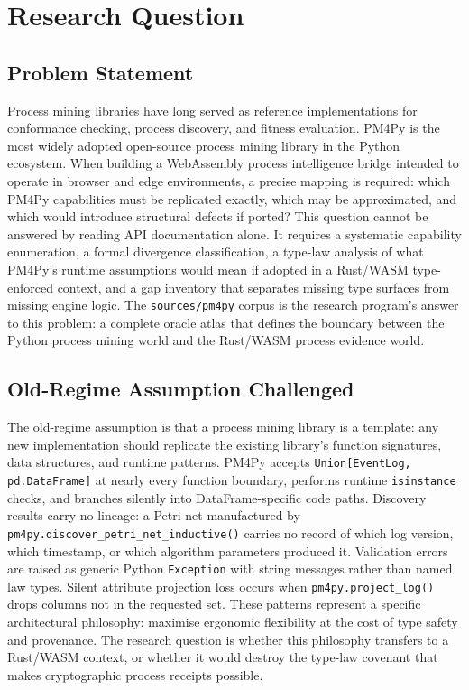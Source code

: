 
\section{Research Question}
\label{sec:sources-pm4py-rq}

\subsection{Problem Statement}
\label{sec:sources-pm4py-rq-problem}

Process mining libraries have long served as reference implementations for conformance
checking, process discovery, and fitness evaluation. PM4Py is the most widely adopted
open-source process mining library in the Python ecosystem. When building a WebAssembly
process intelligence bridge intended to operate in browser and edge environments, a
precise mapping is required: which PM4Py capabilities must be replicated exactly, which
may be approximated, and which would introduce structural defects if ported? This question
cannot be answered by reading API documentation alone. It requires a systematic capability
enumeration, a formal divergence classification, a type-law analysis of what PM4Py's
runtime assumptions would mean if adopted in a Rust/WASM type-enforced context, and a
gap inventory that separates missing type surfaces from missing engine logic. The
\texttt{sources/pm4py} corpus is the research program's answer to this problem: a
complete oracle atlas that defines the boundary between the Python process mining world
and the Rust/WASM process evidence world.

\subsection{Old-Regime Assumption Challenged}
\label{sec:sources-pm4py-rq-oldregime}

The old-regime assumption is that a process mining library is a template: any new
implementation should replicate the existing library's function signatures, data structures,
and runtime patterns. PM4Py accepts \texttt{Union[EventLog, pd.DataFrame]} at nearly every
function boundary, performs runtime \texttt{isinstance} checks, and branches silently into
DataFrame-specific code paths. Discovery results carry no lineage: a Petri net manufactured
by \texttt{pm4py.discover\_petri\_net\_inductive()} carries no record of which log version,
which timestamp, or which algorithm parameters produced it. Validation errors are raised as
generic Python \texttt{Exception} with string messages rather than named law types. Silent
attribute projection loss occurs when \texttt{pm4py.project\_log()} drops columns not in
the requested set. These patterns represent a specific architectural philosophy: maximise
ergonomic flexibility at the cost of type safety and provenance. The research question is
whether this philosophy transfers to a Rust/WASM context, or whether it would destroy the
type-law covenant that makes cryptographic process receipts possible.

